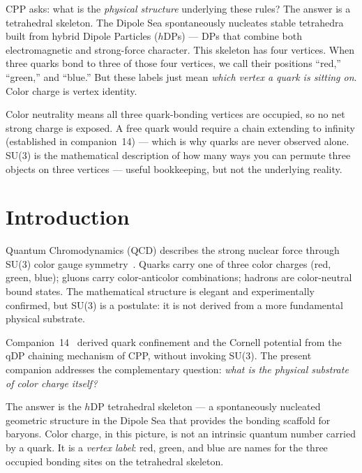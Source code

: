 \documentclass[12pt]{article}
\newcommand{\hDP}{h\mathrm{DP}}
\begin{document}
CPP asks: what is the \emph{physical structure} underlying these
rules?  The answer is a tetrahedral skeleton.  The Dipole Sea
spontaneously nucleates stable tetrahedra built from hybrid Dipole
Particles ($\hDP$s) --- DPs that combine both electromagnetic and
strong-force character.  This skeleton has four vertices.  When three
quarks bond to three of those four vertices, we call their positions
``red,'' ``green,'' and ``blue.''  But these labels just mean
\emph{which vertex a quark is sitting on}.  Color charge is vertex
identity.

Color neutrality means all three quark-bonding vertices are occupied,
so no net strong charge is exposed.  A free quark would require a
chain extending to infinity (established in companion~14) --- which
is why quarks are never observed alone.  SU(3) is the mathematical
description of how many ways you can permute three objects on three
vertices --- useful bookkeeping, but not the underlying reality.

\section{Introduction}
\label{sec:intro}

Quantum Chromodynamics (QCD) describes the strong nuclear force through
SU(3) color gauge symmetry~\cite{gross1973,politzer1973}.  Quarks carry
one of three color charges (red, green, blue); gluons carry
color-anticolor combinations; hadrons are color-neutral bound states.
The mathematical structure is elegant and experimentally confirmed, but
SU(3) is a postulate: it is not derived from a more fundamental
physical substrate.

Companion~14~\cite{c14} derived quark confinement and the Cornell
potential from the qDP chaining mechanism of CPP, without invoking
SU(3).  The present companion addresses the complementary question:
\emph{what is the physical substrate of color charge itself?}

The answer is the $\hDP$ tetrahedral skeleton --- a spontaneously
nucleated geometric structure in the Dipole Sea that provides the
bonding scaffold for baryons.  Color charge, in this picture, is not
an intrinsic quantum number carried by a quark.  It is a \emph{vertex
label}: red, green, and blue are names for the three occupied bonding
sites on the tetrahedral skeleton.
\end{document}
